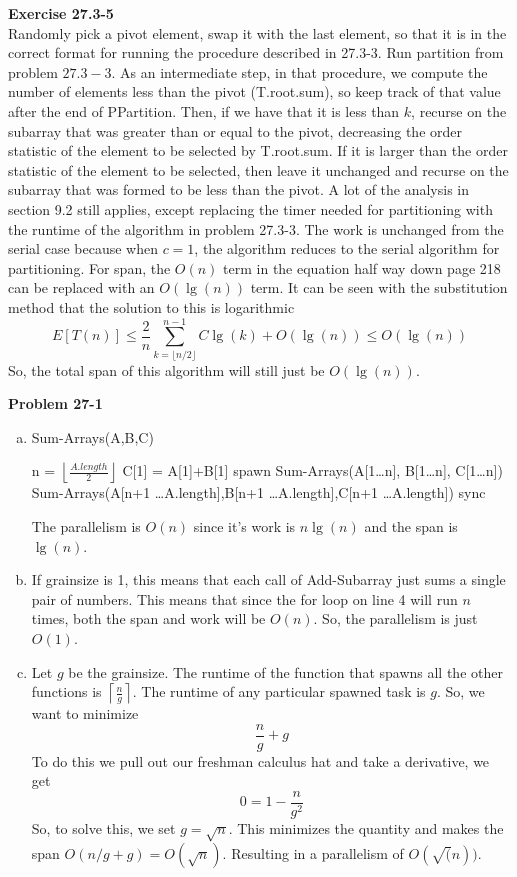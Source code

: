 \documentclass{article}
\begin{document}
\noindent\textbf{Exercise 27.3-5}\\
Randomly pick a pivot element, swap it with the last element, so that it is in the correct format for running the procedure described in 27.3-3.
Run partition from problem $27.3-3$. As an intermediate step, in that procedure, we compute the number of elements less than the pivot (T.root.sum), so keep track of that value after the end of PPartition. Then, if we have that it is less than $k$, recurse on the subarray that was greater than or equal to the pivot, decreasing the order statistic of the element to be selected by T.root.sum. If it is larger than the order statistic of the element to be selected, then leave it unchanged and recurse on the subarray that was formed to be less than the pivot. A lot of the analysis in section 9.2 still applies, except replacing the timer needed for partitioning with the runtime of the algorithm in problem 27.3-3. The work is unchanged from the serial case because when $c=1$, the algorithm reduces to the serial algorithm for partitioning. For span, the $O(n)$ term in the equation half way down page 218 can be replaced with an $O(\lg(n))$ term. It can be seen with the substitution method that the solution to this is logarithmic
\[
E[T(n)] \le \frac{2}{n} \sum_{k=\lfloor n/2\rfloor}^{n-1} C \lg(k) + O(\lg(n)) \le O(\lg(n)) 
\]
So, the total span of this algorithm will still just be $O(\lg(n))$.



\noindent\textbf{Problem 27-1}\\
\begin{enumerate}[a.]
\item
\begin{algorithm}
\caption{Sum-Arrays(A,B,C)}
\begin{algorithmic}
\State n = $\left\lfloor \frac{A.length}{2} \right\rfloor$
\State C[1] = A[1]+B[1]
\Else
\State spawn Sum-Arrays(A[1\ldots n], B[1\ldots n], C[1\ldots n])
\State Sum-Arrays(A[n+1 \ldots A.length],B[n+1 \ldots A.length],C[n+1 \ldots A.length])
\State sync
\EndIf
\end{algorithmic}
\end{algorithm}
The parallelism is $O(n)$ since it's work is $n\lg(n)$ and the span is $\lg(n)$. 
\item
If grainsize is 1, this means that each call of Add-Subarray just sums a single pair of numbers. This means that since the for loop on line 4 will run $n$ times, both the span and work will be $O(n)$. So, the parallelism is just $O(1)$.
\item
Let $g$ be the grainsize. The runtime of the function that spawns all the other functions is $\left\lceil \frac{n}{g} \right\rceil$. The runtime of any particular spawned task is $g$. So, we want to minimize 
\[
\frac{n}{g}+g
\]
To do this we pull out our freshman calculus hat and take a derivative, we get
\[
0 = 1 - \frac{n}{g^2}
\]
So, to solve this, we set $g = \sqrt{n}$. This minimizes the quantity and makes the span $O(n/g +g) = O(\sqrt{n})$. Resulting in a parallelism of $O(\sqrt(n))$.
\end{enumerate}
\end{document}
